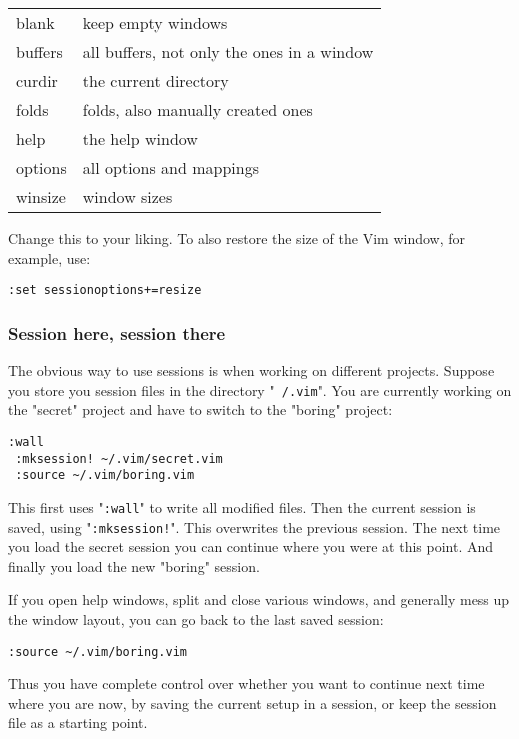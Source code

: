 {\begin{center} \begin{tabular}{l l}
				blank & keep empty windows \\
				buffers & all buffers, not only the ones in a window \\
				curdir & the current directory \\
				folds & folds, also manually created ones \\
				help & the help window \\
				options & all options and mappings \\
				winsize & window sizes \\
\end{tabular} \end{center}
Change this to your liking.
To also restore the size of the Vim window, for example, use:

\begin{Verbatim}[samepage=true]
 :set sessionoptions+=resize
\end{Verbatim}
\subsubsection{Session here, session there}
The obvious way to use sessions is when working on different projects.
Suppose you store you session files in the directory "\texttt{~/.vim}".
You are currently working on the "secret" project and have to switch to the "boring" project:

\begin{Verbatim}[samepage=true]
 :wall
 :mksession! ~/.vim/secret.vim
 :source ~/.vim/boring.vim
\end{Verbatim}

This first uses "\texttt{:wall}" to write all modified files.
Then the current session is saved, using "\texttt{:mksession!}".
This overwrites the previous session.
The next time you load the secret session you can continue where you were at this point.
And finally you load the new "boring" session.

If you open help windows, split and close various windows, and generally mess up the window layout, you can go back to the last saved session:

\begin{Verbatim}[samepage=true]
 :source ~/.vim/boring.vim
\end{Verbatim}

Thus you have complete control over whether you want to continue next time where you are now, by saving the current setup in a session, or keep the session file as a starting point.

}
